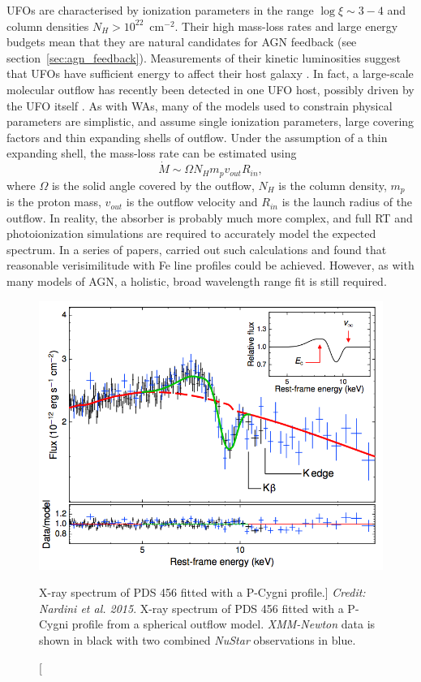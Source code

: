 UFOs are characterised by ionization parameters in the range $\log \xi \sim 3-4$
and column densities $N_H > 10^{22}$~cm$^{-2}$. Their high mass-loss rates
and large energy budgets mean that they are natural candidates for
AGN feedback (see section~\ref{sec:agn_feedback}). Measurements of
their kinetic luminosities suggest that UFOs have sufficient 
energy to affect their host galaxy \citep{gofford2015}. In fact, 
a large-scale molecular outflow has recently been detected in one 
UFO host, possibly driven by the UFO itself \citep{tombesi2015}. 
As with WAs, many of the models
used to constrain physical parameters are simplistic, and assume 
single ionization parameters, large covering factors
and thin expanding shells of outflow.
Under the assumption of a thin expanding shell, 
the mass-loss rate can be estimated using
\citep[e.g.][]{borguet2012}
\begin{equation}
\label{eq:hse}
\dot{M} \sim \Omega N_H m_p v_{out} R_{in},
\end{equation}
where $\Omega$ is the solid angle covered by the outflow, $N_H$
is the column density, $m_p$ is the proton mass, $v_{out}$ is the outflow velocity
and $R_{in}$ is the launch radius of the outflow.
In reality, the absorber is probably much more complex, and full 
RT and photoionization simulations are required to accurately model 
the expected spectrum. 
In a series of papers, 
\cite{simlong2008,sim2010_hydro,sim2010_hydro} carried out such calculations
and found that reasonable verisimilitude with Fe line profiles could be achieved.
However, as with many models of AGN, a holistic, broad wavelength range
fit is still required.

\begin{figure}
\centering
\includegraphics[width=1.0\textwidth]{figures/02-outflows/nardini_pds456.png}
\caption
[X-ray spectrum of PDS 456 fitted with a P-Cygni profile.]
{
{\sl Credit: Nardini et al. 2015}. 
X-ray spectrum of PDS 456 fitted with a P-Cygni profile from a 
spherical outflow model. {\sl XMM-Newton} data is shown in black 
with two combined {\sl NuStar} observations in blue.
} 
\label{fig:nardini}
\end{figure}


